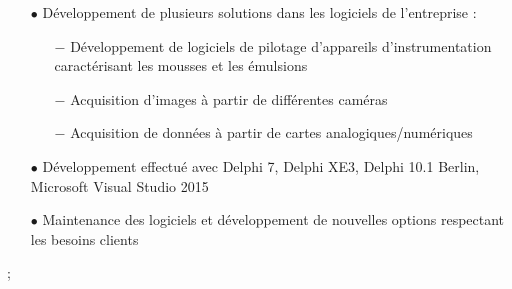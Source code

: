 \documentclass[a4paper]{limecv}
\begin{document}
\begin{cvMainContent}
\begin{cvExperience}
{		\begin{itemize}
			\item[$\bullet$] Développement de plusieurs solutions dans les logiciels de l'entreprise :
			\begin{itemize}
				\item[$-$] Développement de logiciels de pilotage d'appareils d'instrumentation caractérisant les mousses et les émulsions
				\item[$-$] Acquisition d'images à partir de différentes caméras
				\item[$-$] Acquisition de données à partir de cartes analogiques/numériques
			\end{itemize}
			\item[$\bullet$] Développement effectué avec Delphi 7, Delphi XE3, Delphi 10.1 Berlin, Microsoft Visual Studio 2015
			\item[$\bullet$] Maintenance des logiciels et développement de nouvelles options respectant les besoins clients
		\end{itemize}			
	};
  \end{cvExperience}
  
  \begin{cvSkills}
  \end{cvSkills}

  \begin{cvSoftwares}
  \end{cvSoftwares}


\end{cvMainContent}
\end{document}
